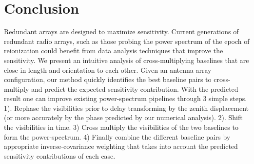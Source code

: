 \documentclass[preprint2,numberedappendix,tighten,twocolappendix]{aastex6}  %
\renewcommand\[{\begin{equation}}
\renewcommand\]{\end{equation}}
\begin{document}

\section{Conclusion}
Redundant arrays are designed to maximize sensitivity. Current generations of redundant radio arrays, such as those probing the power spectrum of the epoch of reionization could benefit from data analysis techniques that improve the sensitivity. We present an intuitive analysis of cross-multiplying baselines that are close in length and orientation to each other. Given an antenna array configuration, our method quickly identifies the best baseline pairs to cross-multiply and predict the expected sensitivity contribution. With the predicted result one can improve existing power-spectrum pipelines through 3 simple steps. 1). Rephase the visibilities prior to delay transforming by the zenith displacement (or more accurately by the phase predicted by our numerical analysis). 2). Shift the visibilities in time. 3) Cross multiply the visibilities of the two baselines  to form the power-spectrum. 4) Finally combine the different baseline pairs by appropriate inverse-covariance weighting that takes into account the predicted sensitivity contributions of each case. 

\appendix
\end{document}
